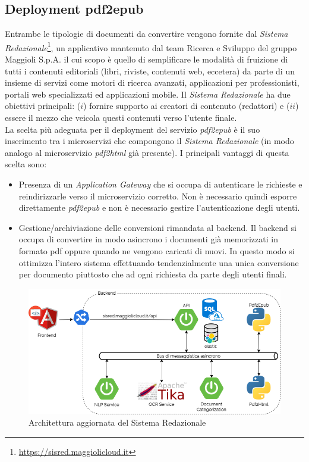 \subsection{Deployment pdf2epub}
Entrambe le tipologie di documenti da convertire vengono fornite dal \textit{Sistema Redazionale}\footnote{\url{https://sisred.maggiolicloud.it}}, un applicativo mantenuto dal team Ricerca e Sviluppo del gruppo Maggioli S.p.A. il cui scopo è quello di semplificare le modalità di fruizione di tutti i contenuti editoriali (libri, riviste, contenuti web, eccetera) da parte di un insieme di servizi come motori di ricerca avanzati, applicazioni per professionisti, portali web specializzati ed applicazioni mobile. Il \textit{Sistema Redazionale} ha due obiettivi principali: ($i$) fornire supporto ai creatori di contenuto (redattori) e ($ii$) essere il mezzo che veicola questi contenuti verso l’utente finale\cite{amslaurea23043}.\\
La scelta più adeguata per il deployment del servizio \textit{pdf2epub} è il suo inserimento tra i microservizi che compongono il \textit{Sistema Redazionale} (in modo analogo al microservizio \textit{pdf2html} già presente). I principali vantaggi di questa scelta sono:
\begin{itemize}
    \item Presenza di un \textit{Application Gateway} che si occupa di autenticare le richieste e reindirizzarle verso il microservizio corretto. Non è necessario quindi esporre direttamente \textit{pdf2epub} e non è necessario gestire l'autenticazione degli utenti.
    \item Gestione/archiviazione delle conversioni rimandata al backend. Il backend si occupa di convertire in modo asincrono i documenti già memorizzati in formato pdf oppure quando ne vengono caricati di nuovi. In questo modo si ottimizza l'intero sistema effettuando tendenzialmente una unica conversione per documento piuttosto che ad ogni richiesta da parte degli utenti finali.
\end{itemize}
\begin{figure}[H]
\centering
\includegraphics[width=1\textwidth]{img/tesi-7-sisred.drawio.png}
\caption{Architettura aggiornata del Sistema Redazionale}
\end{figure}
